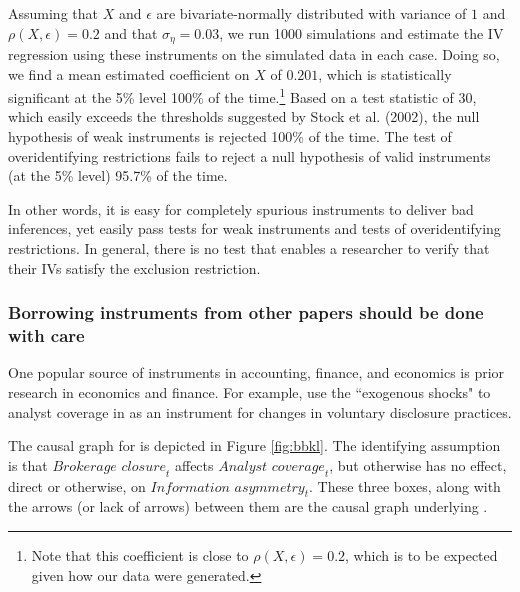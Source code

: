 \documentclass[11pt]{amsart}
\begin{document}
Assuming that $X$ and $\epsilon$ are bivariate-normally distributed with variance of $1$ and $\rho(X, \epsilon)=0.2$ and that $\sigma_{\eta}=0.03$, we run 1000 simulations and  estimate the IV regression using these instruments on the simulated data in each case.
Doing so, we find a mean estimated coefficient on $X$ of $0.201$, which is statistically significant at the 5\% level 100\% of the time.\footnote{Note that this coefficient is close to $\rho(X, \epsilon) = 0.2$, which is to be expected given how our data were generated.} Based on a test statistic of 30, which easily exceeds the thresholds suggested by Stock et al. (2002), the null hypothesis of weak instruments is rejected 100\% of the time. 
The test of overidentifying restrictions fails to reject a null hypothesis of valid instruments (at the 5\% level) 95.7\% of the time.

In other words, it is easy for completely spurious instruments to deliver bad inferences, yet easily pass tests for weak instruments and tests of overidentifying restrictions.
In general, there is no test that enables a researcher to verify that their IVs satisfy the exclusion restriction.

\subsubsection{Borrowing instruments from other papers should be done with care}
One popular source of instruments in accounting, finance, and economics is prior research in economics and finance.
For example, \citet{Balakrishnan:2014js} use the ``exogenous shocks" to analyst coverage in \citet{Kelly:2012ih} as an instrument for changes in voluntary disclosure practices. 

The causal graph for \citet{Kelly:2012ih} is depicted in Figure \ref{fig:bbkl}.
The identifying assumption is that $\textit{Brokerage closure}_t$ affects $\textit{Analyst coverage}_t$, but otherwise has no effect, direct or otherwise, on $\textit{Information asymmetry}_t$.
These three boxes, along with the arrows (or lack of arrows) between them are the causal graph underlying \citet{Kelly:2012ih}.
\end{document}
